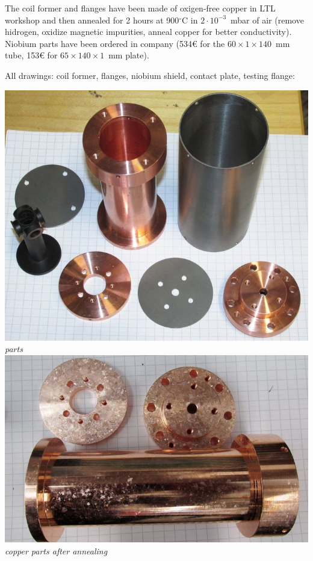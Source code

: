 \documentclass[a4paper]{article}
\begin{document}
The coil former and flanges have been made of oxigen-free copper in LTL
workshop and then annealed for 2 hours at 900$^\circ$C in
$2\cdot10^{-3}$~mbar of air (remove hidrogen, oxidize magnetic
impurities, anneal copper for better conductivity). Niobium parts have
been ordered in \Firmetal{} company (534\euro{} for the
$60\times1\times140$~mm tube, 153\euro{} for $65\times140\times1$~mm
plate).

All drawings: coil former, flanges, niobium shield, contact plate, testing flange:\\

\vbox{\noindent
\includegraphics[width=\linewidth]{img/parts.jpg}\\
{\it parts}}
\vbox{\noindent
\includegraphics[width=\linewidth]{img/parts_ann.jpg}\\
{\it copper parts after annealing}}
\end{document}
